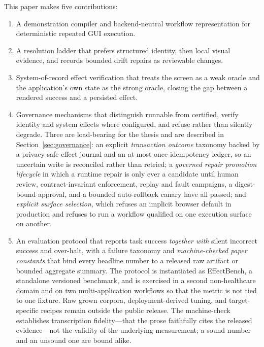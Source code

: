 This paper makes five contributions:
\begin{enumerate}
  \item A demonstration compiler and backend-neutral workflow representation
        for deterministic repeated GUI execution.
  \item A resolution ladder that prefers structured identity, then local visual
        evidence, and records bounded drift repairs as reviewable changes.
  \item System-of-record effect verification that treats the screen as a weak
        oracle and the application's own state as the strong oracle, closing the
        gap between a rendered success and a persisted effect.
  \item Governance mechanisms that distinguish runnable from certified, verify
        identity and system effects where configured, and refuse rather than
        silently degrade. Three are load-bearing for the thesis and are
        described in Section~\ref{sec:governance}: an explicit \emph{transaction
        outcome} taxonomy backed by a privacy-safe effect journal and an
        at-most-once idempotency ledger, so an uncertain write is reconciled
        rather than retried; a \emph{governed repair promotion lifecycle} in
        which a runtime repair is only ever a candidate until human review,
        contract-invariant enforcement, replay and fault campaigns, a
        digest-bound approval, and a bounded auto-rollback canary have all
        passed; and \emph{explicit surface selection}, which refuses an implicit
        browser default in production and refuses to run a workflow qualified on
        one execution surface on another.
  \item An evaluation protocol that reports task success \emph{together with}
        silent incorrect success and over-halt, with a failure taxonomy and
        \emph{machine-checked paper constants} that bind every headline number
        to a released raw artifact or bounded aggregate summary. The protocol is
        instantiated as EffectBench, a standalone versioned benchmark, and is
        exercised in a second non-healthcare domain and on two multi-application
        workflows so that the metric is not tied to one fixture. Raw grown
        corpora, deployment-derived tuning, and target-specific recipes remain
        outside the public release. The machine-check establishes transcription
        fidelity---that the prose faithfully cites the released evidence---not
        the validity of the underlying measurement; a sound number and an
        unsound one are bound alike.
\end{enumerate}


